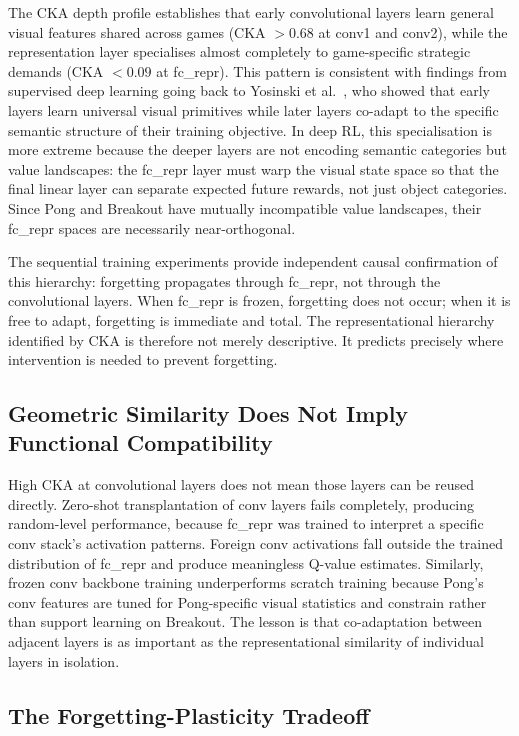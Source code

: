 \documentclass[a4paper]{article}
\begin{document}
The CKA depth profile establishes that early convolutional layers learn general visual
features shared across games (CKA $> 0.68$ at conv1 and conv2), while the representation
layer specialises almost completely to game-specific strategic demands (CKA $< 0.09$ at
fc\_repr). This pattern is consistent with findings from supervised deep learning going back
to Yosinski et al.\ \cite{yosinski2014transferable}, who showed that early layers learn
universal visual primitives while later layers co-adapt to the specific semantic structure
of their training objective. In deep RL, this specialisation is more extreme because the
deeper layers are not encoding semantic categories but value landscapes: the fc\_repr layer
must warp the visual state space so that the final linear layer can separate expected future
rewards, not just object categories. Since Pong and Breakout have mutually incompatible
value landscapes, their fc\_repr spaces are necessarily near-orthogonal.

The sequential training experiments provide independent causal confirmation of this hierarchy:
forgetting propagates through fc\_repr, not through the convolutional layers. When fc\_repr
is frozen, forgetting does not occur; when it is free to adapt, forgetting is immediate and
total. The representational hierarchy identified by CKA is therefore not merely descriptive.
It predicts precisely where intervention is needed to prevent forgetting.

\subsection{Geometric Similarity Does Not Imply Functional Compatibility}

High CKA at convolutional layers does not mean those layers can be reused directly. Zero-shot
transplantation of conv layers fails completely, producing random-level performance, because
fc\_repr was trained to interpret a specific conv stack's activation patterns. Foreign conv
activations fall outside the trained distribution of fc\_repr and produce meaningless Q-value
estimates. Similarly, frozen conv backbone training underperforms scratch training because
Pong's conv features are tuned for Pong-specific visual statistics and constrain rather than
support learning on Breakout. The lesson is that co-adaptation between adjacent layers is as
important as the representational similarity of individual layers in isolation.

\subsection{The Forgetting-Plasticity Tradeoff}
\end{document}
